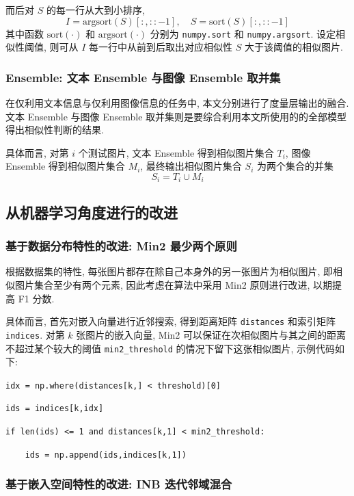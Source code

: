 \documentclass[12pt]{article}
\begin{document}
而后对 $S$ 的每一行从大到小排序, 
\begin{equation}
  I=\text{argsort}(S)[:,::-1],\quad S = \text{sort}(S)[:,::-1]
\end{equation}
其中函数 $\text{sort}(\cdot)$ 和 $\text{argsort}(\cdot)$ 分别为 \verb|numpy.sort| 和 \verb|numpy.argsort|. 设定相似性阈值, 则可从 $I$ 每一行中从前到后取出对应相似性 $S$ 大于该阈值的相似图片.

\subsubsection{Ensemble: 文本 Ensemble 与图像 Ensemble 取并集}

在仅利用文本信息与仅利用图像信息的任务中, 本文分别进行了度量层输出的融合. 文本 Ensemble 与图像 Ensemble 取并集则是要综合利用本文所使用的的全部模型得出相似性判断的结果.

具体而言, 对第 $i$ 个测试图片, 文本 Ensemble 得到相似图片集合 $T_i$, 图像 Ensemble 得到相似图片集合 $M_i$, 最终输出相似图片集合 $S_i$ 为两个集合的并集
\begin{equation}
  S_i=T_i\cup M_i
\end{equation}

\subsection{从机器学习角度进行的改进}

\subsubsection{基于数据分布特性的改进: Min2 最少两个原则}

根据数据集的特性, 每张图片都存在除自己本身外的另一张图片为相似图片, 即相似图片集合至少有两个元素, 因此考虑在算法中采用 Min2 原则进行改进, 以期提高 F1 分数.

具体而言, 首先对嵌入向量进行近邻搜索, 得到距离矩阵 \verb|distances| 和索引矩阵 \verb|indices|. 对第 $k$ 张图片的嵌入向量, Min2 可以保证在次相似图片与其之间的距离不超过某个较大的阈值 \verb|min2_threshold| 的情况下留下这张相似图片, 示例代码如下:

\verb|idx = np.where(distances[k,] < threshold)[0]|

\verb|ids = indices[k,idx]|

\verb|if len(ids) <= 1 and distances[k,1] < min2_threshold:|

\verb|    ids = np.append(ids,indices[k,1])|


\subsubsection{基于嵌入空间特性的改进: INB 迭代邻域混合}
\end{document}
